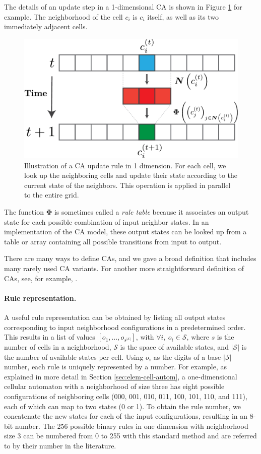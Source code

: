 The details of an update step in a 1-dimensional \ac{CA} is shown in Figure
\ref{fig:ca_base} for example. The neighborhood of the cell $c_{i}$ is $c_{i}$
itself, as well as its two immediately adjacent cells.

\begin{figure}[htbp]
  \centering
 \includegraphics[width=.7\linewidth]{figures/ca_base}
  \caption{Illustration of a \acl{CA} update rule in 1 dimension. For each cell,
  we look up the neighboring cells and update their state according to the current
state of the neighbors. This operation is applied in parallel to the entire grid.}
  \label{fig:ca_base}
\end{figure}

The function $\boldsymbol{\Phi}$ is sometimes called a \emph{rule table} because it
associates an output state for each possible combination of input neighbor
states. In an implementation of the \ac{CA} model, these output states can be
looked up from a table or array containing all possible transitions from input
to output.

There are many ways to define \acp{CA}, and we gave a broad
definition that includes many rarely used \ac{CA} variants. For another more straightforward
definition of \acp{CA}, see, for example, \autocite{kariBasicConceptsCellular2012}.

\paragraph{Rule representation.}
A useful rule representation can be obtained by listing all output states
corresponding to input neighborhood configurations in a predetermined order.
This results in a list of values $[o_1, \ldots, o_{s^{|\mathcal{S}|}}]$, with
$\forall i,\ o_{i} \in \mathcal{S}$, where $s$ is the number of cells in a neighborhood, $\mathcal{S}$ is
the space of available states, and $|\mathcal{S}|$ is the number of available states per
cell. Using $o_{i}$ as the digits of a base-$|\mathcal{S}|$ number, each rule is uniquely
represented by a number. For example, as explained in more detail in Section
\ref{sec:elem-cell-autom}, a one-dimensional cellular automaton with a
neighborhood of size three has eight possible configurations of neighboring cells (000,
001, 010, 011, 100, 101, 110, and 111), each of which can map to two states (0 or
1). To obtain the rule number, we concatenate the new states for each of the
input configurations, resulting in an 8-bit number. The 256 possible binary
rules in one dimension with neighborhood size 3 can be numbered from 0 to 255
with this standard method and are referred to by their number in the literature.

